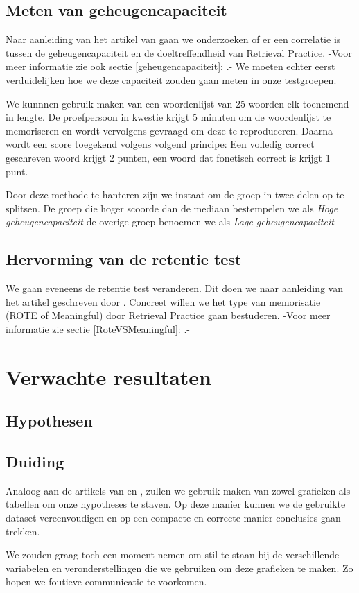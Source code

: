 \documentclass{hogent-article}
\newcommand{\customref}[1]{\underline{\ref{#1}: \nameref{#1}}}
\begin{document}
\subsection{Meten van geheugencapaciteit}
\label{methodology-gc}
Naar aanleiding van het artikel van \cite{Agarwal2016} gaan we onderzoeken of er een correlatie is tussen de geheugencapaciteit en de doeltreffendheid van Retrieval Practice. -Voor meer informatie zie ook sectie \customref{geheugencapaciteit}.- We moeten echter eerst verduidelijken hoe we deze capaciteit zouden gaan meten in onze testgroepen.\\
\par
\noindent
We kunnnen gebruik maken van een woordenlijst van 25 woorden elk toenemend in lengte. De proefpersoon in kwestie krijgt 5 minuten om de woordenlijst te memoriseren en wordt vervolgens gevraagd om deze te reproduceren. Daarna wordt een score toegekend volgens volgend principe: Een volledig correct geschreven woord krijgt 2 punten, een woord dat fonetisch correct is krijgt 1 punt.\\
\par
\noindent
Door deze methode te hanteren zijn we instaat om de groep in twee delen op te splitsen. De groep die hoger scoorde dan de mediaan bestempelen we als \textit{Hoge geheugencapaciteit} de overige groep benoemen we als \textit{Lage geheugencapaciteit}

\subsection{Hervorming van de retentie test}
We gaan eveneens de retentie test veranderen. Dit doen we naar aanleiding van het artikel geschreven door \cite{TamaravanGog2012}. Concreet willen we het type van memorisatie (ROTE of Meaningful) door Retrieval Practice gaan bestuderen. -Voor meer informatie zie sectie \customref{RoteVSMeaningful}.-

\section{Verwachte resultaten}
\subsection{Hypothesen}
\subsection{Duiding}

Analoog aan de artikels van \cite{HenryRoediger2006} en \cite{Agarwal2008}, zullen we gebruik maken van zowel grafieken als tabellen om onze hypotheses te staven. Op deze manier kunnen we de gebruikte dataset vereenvoudigen en op een compacte en correcte manier conclusies gaan trekken.\\
\par
\noindent
We zouden graag toch een moment nemen om stil te staan bij de verschillende variabelen en veronderstellingen die we gebruiken om deze grafieken te maken. Zo hopen we foutieve communicatie te voorkomen.
\end{document}
